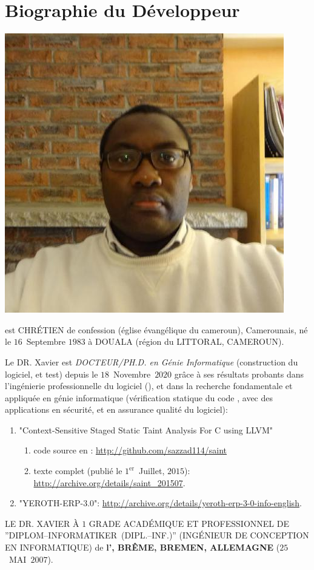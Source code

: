 \section{Biographie du Développeur}\label{chap:biographie}
\vspace{-0.9em}

\begin{center}
\includegraphics[scale=0.32]{../../francais/images/XavierNOUNDOU-2}
\end{center}

\textbf{\myfullacademicname} est CHRÉTIEN de confession
(église évangélique du cameroun),
Camerounais, né le $16$~Septembre $1983$ à
DOUALA (région du LITTORAL, CAMEROUN).

Le DR. Xavier est \textit{DOCTEUR/PH.D. en Génie Informatique}
(construction du logiciel, et test) depuis le $18$~Novembre~$2020$
grâce à ses résultats probants dans l'ingénierie
professionnelle du logiciel (\yerotherpblack), et dans la recherche
fondamentale et appliquée en génie informatique
(vérification statique du code \cplusplus, avec des applications
en sécurité, et en assurance qualité du logiciel):

\begin{enumerate}
	\item "Context-Sensitive Staged Static Taint Analysis
			For C using LLVM"
		\begin{enumerate}[1.]
			\itemsep -0.7em
			\item code source en \cplusplus: \url{http://github.com/sazzad114/saint}
			\item texte complet (publié le $1^\text{er}$~Juillet, $2015$): \url{http://archive.org/details/saint_201507}.
		\end{enumerate}		 

	\item "YEROTH-ERP-3.0": \url{http://archive.org/details/yeroth-erp-3-0-info-english}.\\
\end{enumerate}


LE DR. XAVIER À $1$ GRADE ACADÉMIQUE ET PROFESSIONNEL
DE ''DIPLOM--INFORMATIKER~(DIPL.--INF.)''
(INGÉNIEUR DE CONCEPTION EN INFORMATIQUE) de
\textbf{l'\bremenu, BRÊME, BREMEN, ALLEMAGNE}
($25$~MAI~$2007$).

